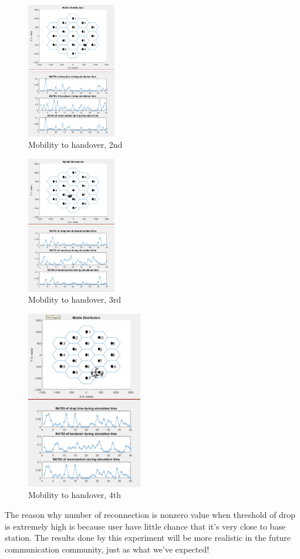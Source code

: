 \documentclass[a4paper]{IEEEtran}
\begin{document}
\begin{figure}[h]
    \includegraphics[width=0.346\textwidth]{exp2/2}
    \caption{Mobility to handover, 2nd}
    \label{fig:mesh16}
\end{figure}
\begin{figure}[h]
    \includegraphics[width=0.346\textwidth]{exp2/3}
    \caption{Mobility to handover, 3rd}
    \label{fig:mesh16}
\end{figure}
\begin{figure}[h]
    \includegraphics[width=0.45\textwidth]{exp2/4}
    \caption{Mobility to handover, 4th}
    \label{fig:mesh16}
\end{figure}
The reason why number of reconnection is nonzero value when threshold of drop is extremely high is because user have little chance that it’s very close to base station. The results done by this experiment will be more realistic in the future communication community, just as what we've expected!
\end{document}
